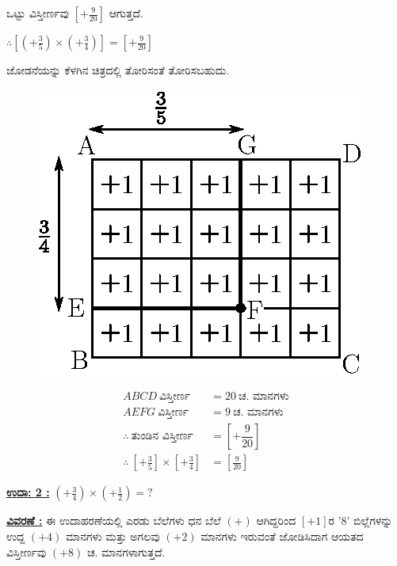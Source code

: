 ಒಟ್ಟು ವಿಸ್ತೀರ್ಣವು $\left[+\frac{9}{20}\right]$ ಆಗುತ್ತದೆ.

\vspace{.1cm}

$\therefore \left[\left(+\frac{3}{5}\right) \times \left(+\frac{3}{4}\right) \right] = \left[+\frac{9}{20} \right]$

ಜೋಡನೆಯನ್ನು ಕೆಳಗಿನ ಚಿತ್ರದಲ್ಲಿ ತೋರಿಸಂತೆ ತೋರಿಸಬಹುದು. 

\vspace{-.3cm}

\begin{figure}[H]
\centering
\includegraphics[scale=0.8]{src/figure/chap3/fig3-23b.eps}
\end{figure}
\begin{align*}
ABCD ~\text{ವಿಸ್ತೀರ್ಣ}  & = 20 ~\text{ಚ. ಮಾನಗಳು}\\
AEFG ~\text{ವಿಸ್ತೀರ್ಣ} & = 9 ~\text{ಚ. ಮಾನಗಳು}\\
\therefore ~\text{ತುಂಡಿನ ವಿಸ್ತೀರ್ಣ} & = \left[+\dfrac{9}{20}\right]\\
\therefore \ \left[+\frac{3}{5}\right]\times \left[+\frac{3}{4}\right] &=\left[\frac{9}{20}\right]
\end{align*}

\noindent
{\textbf{\underline{ಉದಾ: 2 :}}} $\left(+\frac{3}{4} \right) \times \left(+\frac{1}{2} \right) = ?$

\noindent
{\textbf{\underline{ವಿವರಣೆ :}}} ಈ ಉದಾಹರಣೆಯಲ್ಲಿ ಎರಡು ಬೆಲೆಗಳು ಧನ ಬೆಲೆ $(+)$ ಆಗಿದ್ದರಿಂದ $[+1]$ರ '8' ಬಿಲ್ಲೆಗಳನ್ನು ಉದ್ದ $(+4)$ ಮಾನಗಳು ಮತ್ತು ಅಗಲವು $(+2)$ ಮಾನಗಳು ಇರುವಂತೆ ಜೋಡಿಸಿದಾಗ ಆಯತದ ವಿಸ್ತೀರ್ಣವು $(+8)$ ಚ. ಮಾನಗಳಾಗುತ್ತದೆ. 

